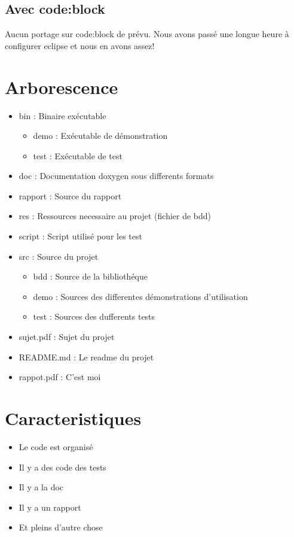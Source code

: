 \documentclass[a4paper]{article}
\begin{document}
\subsection{Avec code:block}

Aucun portage sur code:block de prévu. 
Nous avons passé une longue heure à configurer eclipse et nous en avons assez!

\section{Arborescence}

\begin{itemize}
\item bin : Binaire exécutable
\begin{itemize}
  \item demo : Exécutable de démonstration
  \item test : Exécutable de test
\end{itemize}
\item doc : Documentation doxygen sous differents formats
\item rapport : Source du rapport
\item res : Ressources necessaire au projet (fichier de bdd)
\item script  : Script utilisé pour les test
\item src : Source du projet
\begin{itemize}
  \item bdd   : Source de la bibliothéque
  \item demo  : Sources des differentes démonstrations d'utilisation
  \item test  : Sources des dufferents tests
\end{itemize}

\item sujet.pdf  : Sujet du projet
\item README.md  : Le readme du projet 
\item rappot.pdf : C'est moi
\end{itemize}

\section{Caracteristiques}

\begin{itemize}
	\item Le code est organisé
	\item Il y a des code des tests
	\item Il y a la doc
	\item Il y a un rapport
	\item Et pleins d'autre chose
\end{itemize}


\end{document}
